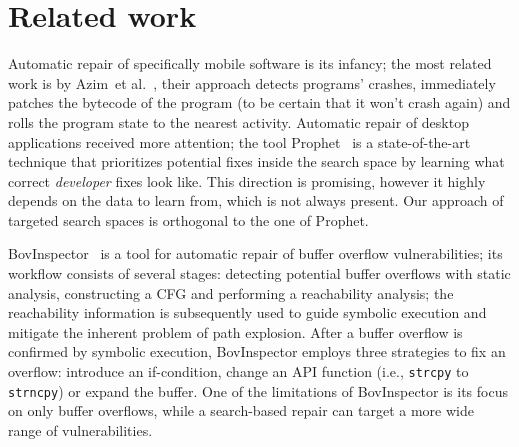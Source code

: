 \section{Related work}

Automatic repair of specifically mobile software is its infancy; the most related work is by Azim~et al.~\cite{azim2014towards}, their approach detects programs' crashes, immediately patches the bytecode of the program (to be certain that it won't crash again) and rolls the program state to the nearest activity. Automatic repair of desktop applications received more attention; the tool Prophet~\cite{long2015prophet} is a state-of-the-art technique that prioritizes potential fixes inside the search space by learning what correct \emph{developer} fixes look like. This direction is promising, however it highly depends on the data to learn from, which is not always present. Our approach of targeted search spaces is orthogonal to the one of Prophet.

BovInspector~\cite{bovinspector} is a tool for automatic repair of buffer overflow vulnerabilities; its workflow consists of several stages: detecting potential buffer overflows with static analysis, constructing a CFG and performing a reachability analysis; the reachability information is subsequently used to guide symbolic execution and mitigate the inherent problem of path explosion. After a buffer overflow is confirmed by symbolic execution, BovInspector employs three strategies to fix an overflow: introduce an if-condition, change an API function (i.e., \texttt{strcpy} to \texttt{strncpy}) or expand the buffer. One of the limitations of BovInspector is its focus on only buffer overflows, while a search-based repair can target a more wide range of vulnerabilities.
